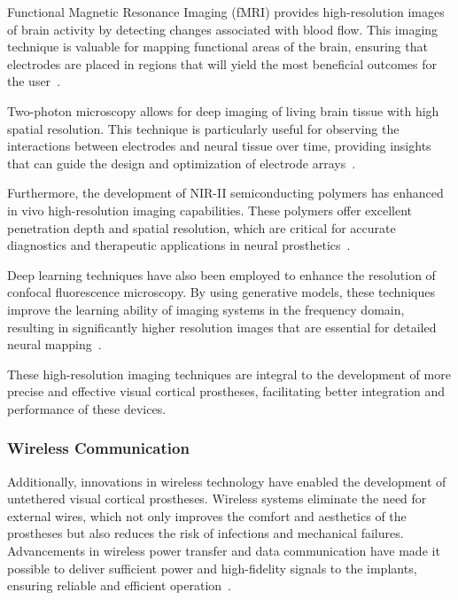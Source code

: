 \documentclass[twocolumn,10pt]{article}
\begin{document}
Functional Magnetic Resonance Imaging (fMRI) provides high-resolution images of
brain activity by detecting changes associated with blood flow. This imaging
technique is valuable for mapping functional areas of the brain, ensuring that
electrodes are placed in regions that will yield the most beneficial outcomes
for the user~\parencite{landelleInvestigatingHumanSpinal2021}.

Two-photon microscopy allows for deep imaging of living brain tissue with high
spatial resolution. This technique is particularly useful for observing the
interactions between electrodes and neural tissue over time, providing insights
that can guide the design and optimization of electrode
arrays~\parencite{yangIntegratedMicroprismMicroelectrode2024}.

Furthermore, the development of NIR-II semiconducting polymers has enhanced in
vivo high-resolution imaging capabilities. These polymers offer excellent
penetration depth and spatial resolution, which are critical for accurate
diagnostics and therapeutic applications in neural prosthetics~\parencite{wangRecentProgressSecond2023,kangNIRIISemiconductingPolymers2023}.

Deep learning techniques have also been employed to enhance the resolution of
confocal fluorescence microscopy. By using generative models, these techniques
improve the learning ability of imaging systems in the frequency domain,
resulting in significantly higher resolution images that are essential for
detailed neural mapping~\parencite{huangEnhancingImageResolution2023}.

These high-resolution imaging techniques are integral to the development of more
precise and effective visual cortical prostheses, facilitating better
integration and performance of these devices.

\subsubsection*{Wireless Communication}
Additionally, innovations in wireless technology have enabled the development of
untethered visual cortical prostheses. Wireless systems eliminate the need for
external wires, which not only improves the comfort and aesthetics of the
prostheses but also reduces the risk of infections and mechanical failures.
Advancements in wireless power transfer and data communication have made it
possible to deliver sufficient power and high-fidelity signals to the implants,
ensuring reliable and efficient
operation~\parencite{rosenfeldTissueResponseChronically2020}.
\end{document}
